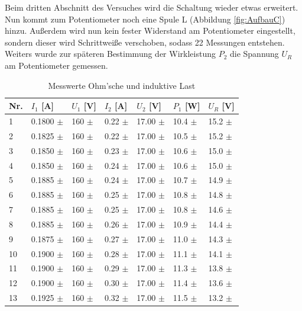 \documentclass[12pt,a4paper,twoside]{article}
\begin{document}
Beim dritten Abschnitt des Versuches wird die Schaltung wieder etwas erweitert. Nun kommt zum Potentiometer noch eine Spule L (Abbildung \ref{fig:AufbauC}) hinzu.
Außerdem wird nun kein fester Widerstand am Potentiometer eingestellt, sondern dieser wird Schrittweiße verschoben, sodass 22 Messungen entstehen. Weiters wurde zur späteren Bestimmung der Wirkleistung $P_{2}$ die Spannung $U_{R}$ am Potentiometer gemessen.

\begin{table}[H]
    \centering
    \caption{Messwerte Ohm'sche und induktive Last}
    \label{tab:messwerteLeerlauf}
    \begin{tabular}{| l | l | l | l | l | l | l |}
        \hline
        Nr. & $I_{1}$ [A]  & $U_{1}$ [V] & $I_{2}$ [A] & $U_{2}$ [V] & $P_{1}$ [W] & $U_{R}$ [V] \\
        \hline
        1 & 0.1800 $\pm$  & 160 $\pm$  & 0.22 $\pm$  & 17.00 $\pm$  & 10.4 $\pm$ & 15.2 $\pm$  \\
        2 & 0.1825 $\pm$  & 160 $\pm$  & 0.22 $\pm$  & 17.00 $\pm$  & 10.5 $\pm$ & 15.2 $\pm$  \\
        3 & 0.1850 $\pm$  & 160 $\pm$  & 0.23 $\pm$  & 17.00 $\pm$  & 10.6 $\pm$ & 15.0 $\pm$  \\
        4 & 0.1850 $\pm$  & 160 $\pm$  & 0.24 $\pm$  & 17.00 $\pm$  & 10.6 $\pm$ & 15.0 $\pm$  \\
        5 & 0.1885 $\pm$  & 160 $\pm$  & 0.24 $\pm$  & 17.00 $\pm$  & 10.7 $\pm$ & 14.9 $\pm$  \\
        6 & 0.1885 $\pm$  & 160 $\pm$  & 0.25 $\pm$  & 17.00 $\pm$  & 10.8 $\pm$ & 14.8 $\pm$  \\
        7 & 0.1885 $\pm$  & 160 $\pm$  & 0.25 $\pm$  & 17.00 $\pm$  & 10.8 $\pm$ & 14.6 $\pm$  \\
        8 & 0.1885 $\pm$  & 160 $\pm$  & 0.26 $\pm$  & 17.00 $\pm$  & 10.9 $\pm$ & 14.4 $\pm$  \\
        9 & 0.1875 $\pm$  & 160 $\pm$  & 0.27 $\pm$  & 17.00 $\pm$  & 11.0 $\pm$ & 14.3 $\pm$  \\
        10 & 0.1900 $\pm$  & 160 $\pm$  & 0.28 $\pm$  & 17.00 $\pm$  & 11.1 $\pm$ & 14.1 $\pm$  \\
        11 & 0.1900 $\pm$  & 160 $\pm$  & 0.29 $\pm$  & 17.00 $\pm$  & 11.3 $\pm$ & 13.8 $\pm$  \\
        12 & 0.1900 $\pm$  & 160 $\pm$  & 0.30 $\pm$  & 17.00 $\pm$  & 11.4 $\pm$ & 13.6 $\pm$  \\
        13 & 0.1925 $\pm$  & 160 $\pm$  & 0.32 $\pm$  & 17.00 $\pm$  & 11.5 $\pm$ & 13.2 $\pm$  \\

\end{tabular}
\end{table}
\end{document}
